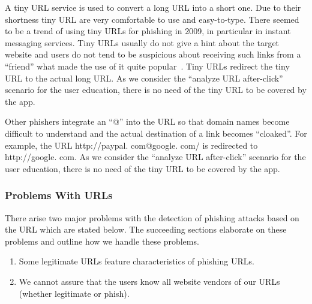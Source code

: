 \begin{description}[leftmargin=0cm]
	\item[Tiny URLs] A tiny URL service is used to convert a long URL into a short one.
 Due to their shortness tiny URL are very comfortable to use and easy-to-type.
 There seemed to be a trend of using tiny URLs for phishing in 2009, in particular in instant messaging services.
 Tiny URLs usually do not give a hint about the target website and users do not tend to be suspicious about receiving such links from a ``friend'' what made the use of it quite popular~\cite{tinyurlpcworld}. Tiny URLs redirect the tiny URL to the actual long URL.
 As we consider the ``analyze URL after-click'' scenario for the user education, there is no need of the tiny URL to be covered by the app.

		\item[Cloaked URLs] Other phishers integrate an ``@'' into the URL so that domain names become difficult to understand and the actual destination of a link becomes ``cloaked''\cite{alnajim2009fighting}. For example, the URL http://paypal.
com@google.
com/ is redirected to http://google.
com.
 As we consider the ``analyze URL after-click'' scenario for the user education, there is no need of the tiny URL to be covered by the app.

\end{description}

\subsubsection{Problems With URLs}
There arise two major problems with the detection of phishing attacks based on the URL which are stated below. 
The succeeding sections elaborate on these problems and outline how we handle these problems.

\begin{enumerate}
	\item Some legitimate URLs feature characteristics of phishing URLs.
	\item We cannot assure that the users know all website vendors of our URLs (whether legitimate or phish).
\end{enumerate}

